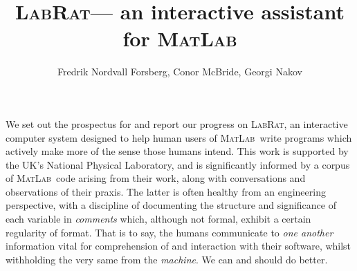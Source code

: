 \documentclass{article}
\newcommand{\lr}{\textsc{LabRat}}
\newcommand{\ma}{\textsc{MatLab}}
\newcommand{\remph}{\emph}
\begin{document}
\title{\lr --- an interactive assistant for \ma}
\author{Fredrik Nordvall Forsberg, Conor McBride, Georgi Nakov}
\maketitle

We set out the prospectus for and report our progress on \lr, an interactive computer system designed to help human users of \ma\ write programs which actively make more of the sense those humans intend. This work is supported by the UK's National Physical Laboratory, and is significantly informed by a corpus of \ma\ code arising from their work, along with conversations and observations of their praxis. The latter is often healthy from an engineering perspective, with a discipline of documenting the structure and significance of each variable in \remph{comments} which, although not formal, exhibit a certain regularity of format. That is to say, the humans communicate to \remph{one another} information vital for comprehension of and interaction with their software, whilst withholding the very same from the \remph{machine}. We can and should do better.
\end{document}
